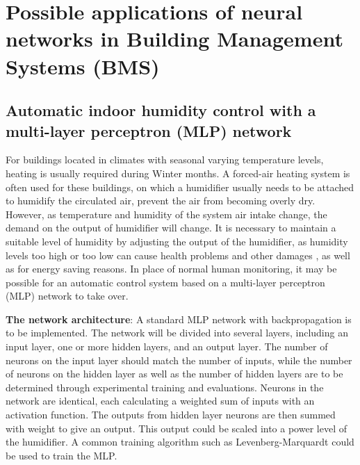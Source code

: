 \documentclass[10pt, oneside]{article}
\begin{document}
\section{Possible applications of neural networks in Building Management Systems (BMS)}

\subsection{Automatic indoor humidity control with a multi-layer perceptron (MLP) network}

For buildings located in climates with seasonal varying temperature levels, heating is usually required during Winter months. A forced-air heating system is often used for these buildings, on which a humidifier \cite{swimmer1970forced} usually needs to be attached to humidify the circulated air, prevent the air from becoming overly dry. However, as temperature and humidity of the system air intake change, the demand on the output of humidifier will change. It is necessary to maintain a suitable level of humidity by adjusting the output of the humidifier, as humidity levels too high or too low can cause health problems and other damages \cite{humidity-factors}, as well as for energy saving reasons. In place of normal human monitoring, it may be possible for an automatic control system based on a multi-layer perceptron (MLP) network to take over.

\textbf{The network architecture}: A standard MLP network with backpropagation is to be implemented. The network will be divided into several layers, including an input layer, one or more hidden layers, and an output layer. The number of neurons on the input layer should match the number of inputs, while the number of neurons on the hidden layer as well as the number of hidden layers are to be determined through experimental training and evaluations. Neurons in the network are identical, each calculating a weighted sum of inputs with an activation function. The outputs from hidden layer neurons are then summed with weight to give an output. \cite[p. 2]{rbf-lecture} This output could be scaled into a power level of the humidifier. A common training algorithm such as Levenberg-Marquardt could be used to train the MLP.
\end{document}
